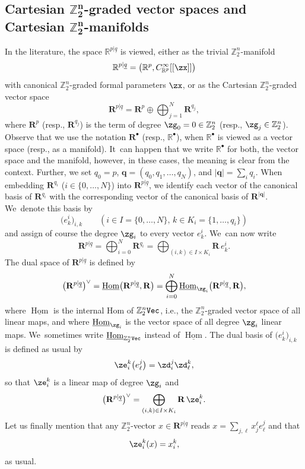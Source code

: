 \documentclass[10pt,a4paper]{amsart}
\newcommand{\op}[1]{\operatorname{#1}}
\newcommand{\R}{{\mathbb R}}
\newcommand{\Z}{{\mathbb Z}}
\def\ul{\underline}
\def\ul{\underline}
\newcommand{\0}{\otimes}
\newcommand{\z}{\Z_2^n}
\numberwithin{equation}{section}
\begin{document}
\subsection[Cartesian Z2n-graded vector spaces and Cartesian Z2n-manifolds]
{Cartesian $\boldsymbol{\Z_2^n}$-graded vector spaces and Cartesian $\boldsymbol{\Z_2^n}$-manifolds}
\newcommand{\mbf}{\mathbf}
\newcommand{\Ci}{C^\infty}
\newcommand{\iho}{\ul{\op{Hom}}}
In the literature, the space $\R^{p|\ul{q}}$ is viewed, either as the trivial $\Z_2^n$-manifold
\[
\R^{p|\ul{q}}=\big(\R^p,\Ci_{\R^p}[[\zx]]\big)
\]
with canonical $\z$-graded formal parameters $\zx$, or as the Cartesian $\Z_2^n$-graded vector space
\[
\mbf{R}^{p|\ul{q}}=\mbf{R}^p\oplus\bigoplus_{j=1}^N\mbf{R}^{q_j},
\]
where $\mbf{R}^p$ (resp., $\mbf{R}^{q_j}$) is the term of degree $\zg_0=0\in\Z_2^n$ (resp., $\zg_j\in\Z_2^n$). Observe that we use the notation $\mbf{R}^\bullet$ (resp., $\R^\bullet$), when $\R^\bullet$ is viewed as a vector space (resp., as a manifold). It~can happen that we write $\R^\bullet$ for both, the vector space and the manifold, however, in these cases, the meaning is clear from the context. Further, we set $q_0=p$, $\mathbf{q}=(q_0,q_1,\dots,q_N)$, and $|\mathbf{q}|=\sum_iq_i$. When embedding $\mbf{R}^{q_i}$ ($i\in\{0,\dots,N\}$) into $\mbf{R}^{p|\ul{q}}$, we identify each vector of the canonical basis of $\mbf{R}^{q_i}$ with the corresponding vector of the canonical basis of $\mbf{R}^{|\mathbf{q}|}$. We~denote this basis by
\[
\big(e^i_k\big)_{i,k}\qquad (i\in I=\{0,\dots,N\},\, k\in K_i=\{1,\dots,q_i\})
\]
and assign of course the degree $\zg_i$ to every vector $e^i_k$. We~can now write
\[
\mbf{R}^{p|\ul q}=\bigoplus_{i=0}^N\mbf{R}^{q_i}=\bigoplus_{(i,k)\in I\times K_i}\mbf{R}\, e^i_k.
\]
The dual space of $\mbf{R}^{p|\ul q}$ is defined by
\[
\big(\mbf{R}^{p|\ul q}\big)^\vee = \ul{\op{Hom}}\big(\mbf{R}^{p|\ul q},\mbf{R}\big)=\bigoplus_{i=0}^N\iho_{\zg_i}\big(\mbf{R}^{p|\ul q},\mbf{R}\big),
\]
where $\iho$ is the internal Hom of $\Z_2^n\tt Vec$, i.e., the $\Z_2^n$-graded vector space of all linear maps, and where $\iho_{\zg_i}$ is the vector space of all degree $\zg_i$ linear maps. We~sometimes write $\iho_{\Z_2^n\tt Vec}$ instead of $\iho$. The dual basis of $\big(e^i_k\big)_{i,k}$ is defined as usual by
\[
\ze^k_i\big(e^j_\ell\big)=\zd^j_i\zd^k_\ell,
\]
so that $\ze^k_i$ is a linear map of degree $\zg_i$ and
\[
\big(\mbf{R}^{p|\ul q}\big)^\vee=\bigoplus_{(i,k)\in I\times K_i}\mbf{R}\,\ze^k_i.
\]
Let us finally mention that any $\Z_2^n$-vector $x\in\mbf{R}^{p|\ul q}$ reads $x=\sum_{j,\ell}x^\ell_j e^j_\ell$ and that
\begin{gather}\label{Ass1}
\ze^k_i(x)=x^k_i,
\end{gather}
as usual.
\end{document}
